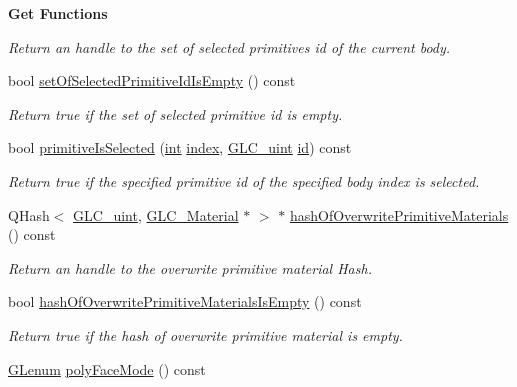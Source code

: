 \begin{Indent}{\bf Get Functions}
\begin{DoxyCompactItemize}
\begin{DoxyCompactList}\small\item\em Return an handle to the set of selected primitives id of the current body. \end{DoxyCompactList}\item 
bool \hyperlink{class_g_l_c___render_properties_a86b3ac87a7d0383caa725b52cb5f3f9f}{set\-Of\-Selected\-Primitive\-Id\-Is\-Empty} () const 
\begin{DoxyCompactList}\small\item\em Return true if the set of selected primitive id is empty. \end{DoxyCompactList}\item 
bool \hyperlink{class_g_l_c___render_properties_a6788203fe3b1ca6b5450ae33baa1f19b}{primitive\-Is\-Selected} (\hyperlink{ioapi_8h_a787fa3cf048117ba7123753c1e74fcd6}{int} \hyperlink{glext_8h_ab47dd9958bcadea08866b42bf358e95e}{index}, \hyperlink{glc__global_8h_abf950976fabed69026558df8e2da6c6b}{G\-L\-C\-\_\-uint} \hyperlink{glext_8h_a58c2a664503e14ffb8f21012aabff3e9}{id}) const 
\begin{DoxyCompactList}\small\item\em Return true if the specified primitive id of the specified body index is selected. \end{DoxyCompactList}\item 
Q\-Hash$<$ \hyperlink{glc__global_8h_abf950976fabed69026558df8e2da6c6b}{G\-L\-C\-\_\-uint}, \hyperlink{class_g_l_c___material}{G\-L\-C\-\_\-\-Material} $\ast$ $>$ $\ast$ \hyperlink{class_g_l_c___render_properties_a594092e24ffb8e39700f2a6d46691531}{hash\-Of\-Overwrite\-Primitive\-Materials} () const 
\begin{DoxyCompactList}\small\item\em Return an handle to the overwrite primitive material Hash. \end{DoxyCompactList}\item 
bool \hyperlink{class_g_l_c___render_properties_ab78c2f97e2f89477fcf923beba133813}{hash\-Of\-Overwrite\-Primitive\-Materials\-Is\-Empty} () const 
\begin{DoxyCompactList}\small\item\em Return true if the hash of overwrite primitive material is empty. \end{DoxyCompactList}\item 
\hyperlink{glext_8h_a508b2dec21679e2e346cad3e0d1969bf}{G\-Lenum} \hyperlink{class_g_l_c___render_properties_ae65f4f25489852ec2571335614773dda}{poly\-Face\-Mode} () const 

\end{DoxyCompactItemize}
\end{Indent}
